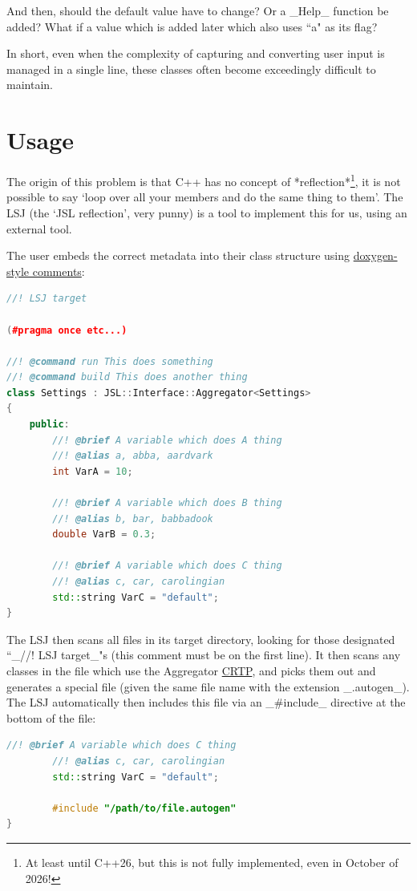	And then, should the default value have to change? Or a _Help_ function be added? What if a value which is added later which also uses ``a" as its flag?

	In short, even when the complexity of capturing and converting user input is managed in a single line, these classes often become exceedingly difficult to maintain.

\section{Usage}

	The origin of this problem is that C++ has no concept of *reflection*\footnote{At least until C++26, but this is not fully implemented, even in October of 2026!}, it is not possible to say `loop over all your members and do the same thing to them'. The LSJ (the `JSL reflection', very punny) is a tool to implement this for us, using an external tool.


	The user embeds the correct metadata into their class structure using \href{https://www.doxygen.nl/}{doxygen-style comments}:


	\begin{lstlisting}[language=c++]
//! LSJ target

(#pragma once etc...)
 
//! @command run This does something
//! @command build This does another thing
class Settings : JSL::Interface::Aggregator<Settings>
{
	public:
		//! @brief A variable which does A thing	
		//! @alias a, abba, aardvark
		int VarA = 10;

		//! @brief A variable which does B thing
		//! @alias b, bar, babbadook
		double VarB = 0.3;

		//! @brief A variable which does C thing
		//! @alias c, car, carolingian
		std::string VarC = "default";
}
\end{lstlisting}

	The LSJ then scans all files in its target directory, looking for those designated ``_//! LSJ target_"s (this comment must be on the first line). It then scans any classes in the file which use the Aggregator \href{https://en.wikipedia.org/wiki/Curiously_recurring_template_pattern}{CRTP}, and picks them out and generates a special file (given the same file name with the extension _.autogen_). The LSJ automatically then includes this file via an _\#include_ directive at the bottom of the file:

	\begin{lstlisting}[language=c++]
		//! @brief A variable which does C thing
		//! @alias c, car, carolingian
		std::string VarC = "default";

		#include "/path/to/file.autogen"
}
\end{lstlisting}

